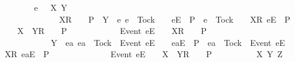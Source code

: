 \ \ \ \ \ \ \ {\isacharparenleft}{\isasymAnd}e\ {\isasymrho}\ {\isasymsigma}\ X\ Y{\isachardot}\isanewline
\ \ \ \ \ \ \ \ \ \ \ {\isacharparenleft}{\isasymrho}\ {\isacharat}\ {\isacharbrackleft}X{\isacharbrackright}\isactrlsub R\ {\isacharhash}\ {\isasymsigma}\ {\isasymin}\ P\ {\isasymand}\ Y\ {\isasyminter}\ {\isacharbraceleft}e{\isachardot}\ e\ {\isasymnoteq}\ Tock\ {\isasymand}\ {\isasymrho}\ {\isacharat}\ {\isacharbrackleft}{\isacharbrackleft}e{\isacharbrackright}\isactrlsub E{\isacharbrackright}\ {\isasymin}\ P\ {\isasymor}\ e\ {\isacharequal}\ Tock\ {\isasymand}\ {\isasymrho}\ {\isacharat}\ {\isacharbrackleft}{\isacharbrackleft}X{\isacharbrackright}\isactrlsub R{\isacharcomma}\ {\isacharbrackleft}e{\isacharbrackright}\isactrlsub E{\isacharbrackright}\ {\isasymin}\ P{\isacharbraceright}\ {\isacharequal}\ {\isacharbraceleft}{\isacharbraceright}\ {\isasymLongrightarrow}\ {\isasymrho}\ {\isacharat}\ {\isacharbrackleft}X\ {\isasymunion}\ Y{\isacharbrackright}\isactrlsub R\ {\isacharhash}\ {\isasymsigma}\ {\isasymin}\ P{\isacharparenright}\ {\isasymLongrightarrow}\isanewline
\ \ \ \ \ \ \ \ \ \ \ {\isacharbrackleft}Event\ e{\isacharbrackright}\isactrlsub E\ {\isacharhash}\ {\isasymrho}\ {\isacharat}\ {\isacharbrackleft}X{\isacharbrackright}\isactrlsub R\ {\isacharhash}\ {\isasymsigma}\ {\isasymin}\ P\ {\isasymand}\isanewline
\ \ \ \ \ \ \ \ \ \ \ Y\ {\isasyminter}\ {\isacharbraceleft}ea{\isachardot}\ ea\ {\isasymnoteq}\ Tock\ {\isasymand}\ {\isacharbrackleft}Event\ e{\isacharbrackright}\isactrlsub E\ {\isacharhash}\ {\isasymrho}\ {\isacharat}\ {\isacharbrackleft}{\isacharbrackleft}ea{\isacharbrackright}\isactrlsub E{\isacharbrackright}\ {\isasymin}\ P\ {\isasymor}\ ea\ {\isacharequal}\ Tock\ {\isasymand}\ {\isacharbrackleft}Event\ e{\isacharbrackright}\isactrlsub E\ {\isacharhash}\ {\isasymrho}\ {\isacharat}\ {\isacharbrackleft}{\isacharbrackleft}X{\isacharbrackright}\isactrlsub R{\isacharcomma}\ {\isacharbrackleft}ea{\isacharbrackright}\isactrlsub E{\isacharbrackright}\ {\isasymin}\ P{\isacharbraceright}\ {\isacharequal}\ {\isacharbraceleft}{\isacharbraceright}\ {\isasymLongrightarrow}\isanewline
\ \ \ \ \ \ \ \ \ \ \ {\isacharbrackleft}Event\ e{\isacharbrackright}\isactrlsub E\ {\isacharhash}\ {\isasymrho}\ {\isacharat}\ {\isacharbrackleft}X\ {\isasymunion}\ Y{\isacharbrackright}\isactrlsub R\ {\isacharhash}\ {\isasymsigma}\ {\isasymin}\ P{\isacharparenright}\ {\isasymLongrightarrow}\isanewline
\ \ \ \ \ \ \ {\isacharparenleft}{\isasymAnd}{\isasymrho}\ {\isasymsigma}\ X\ Y\ Z{\isachardot}\isanewline

